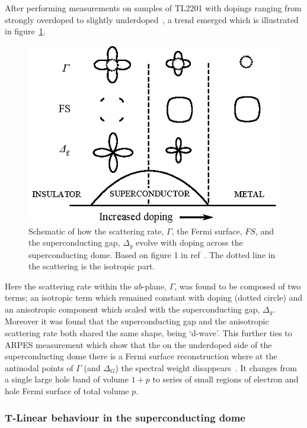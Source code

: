 After performing measurements on samples of \ac{TL2201} with dopings ranging from strongly overdoped to slightly underdoped~\cite{Abdel-Jawad2006}, a trend emerged which is illustrated in figure~\ref{Fig:Intro:AnisotropyPhase}. 
\begin{figure}[htbp]
    \begin{center}
        \includegraphics[scale=0.9]{Chapter-Introduction/Figures/AnisotropyPhase/AnisotropyPhase}
        \caption{Schematic of how the scattering rate, $\Gamma$, the Fermi surface, $FS$, and the superconducting gap, $\Delta_g$ evolve with doping across the superconducting dome. Based on figure 1 in ref~\cite{Taillefer2006}. The dotted line in the scattering is the isotropic part.}
        \label{Fig:Intro:AnisotropyPhase}
    \end{center}
\end{figure}
Here the scattering rate within the $ab$-plane, $\Gamma$, was found to be composed of two terms; an isotropic term which remained constant with doping (dotted circle) and an anisotropic component which scaled with the superconducting gap, $\Delta_g$. Moreover it was found that the superconducting gap and the anisotropic scattering rate both shared the same shape, being `d-wave'. This further ties to \ac{ARPES} measurement which show that the on the underdoped side of the superconducting dome there is a Fermi surface reconstruction where at the antinodal points of $\Gamma$ (and $\Delta_G$) the spectral weight disappears~\cite{Norman2010}. It changes from a single large hole band of volume $1+p$ to series of small regions of electron and hole Fermi surface of total volume $p$.

\subsubsection{T-Linear behaviour in the superconducting dome}

